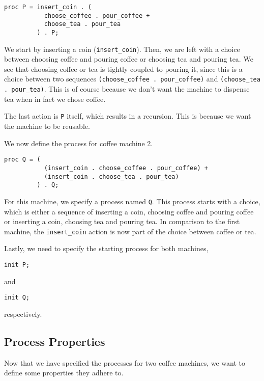 \documentclass{clseminar}
\begin{document}
  \begin{lstlisting}[language=mCRL2]
proc P = insert_coin . (
           choose_coffee . pour_coffee +
           choose_tea . pour_tea
         ) . P;
  \end{lstlisting}

  We start by inserting a coin (\texttt{insert\_coin}). Then, we are left with a choice between choosing coffee and pouring coffee or choosing tea and pouring tea. We see that choosing coffee or tea is tightly coupled to pouring it, since this is a choice between two sequences \texttt{(choose\_coffee . pour\_coffee)} and \texttt{(choose\_tea . pour\_tea)}. This is of course because we don't want the machine to dispense tea when in fact we chose coffee.

  The last action is \texttt{P} itself, which results in a recursion. This is because we want the machine to be reusable.

  We now define the process for coffee machine 2.

  \begin{lstlisting}[language=mCRL2]
proc Q = (
           (insert_coin . choose_coffee . pour_coffee) +
           (insert_coin . choose_tea . pour_tea)
         ) . Q;
  \end{lstlisting}

  For this machine, we specify a process named \texttt{Q}. This process starts with a choice, which is either a sequence of inserting a coin, choosing coffee and pouring coffee or inserting a coin, choosing tea and pouring tea. In comparison to the first machine, the \texttt{insert\_coin} action is now part of the choice between coffee or tea.

  Lastly, we need to specify the starting process for both machines,

  \begin{lstlisting}[language=mCRL2]
init P;
  \end{lstlisting}

  and

  \begin{lstlisting}[language=mCRL2]
init Q;
  \end{lstlisting}

  respectively.

  \subsection{Process Properties}

  Now that we have specified the processes for two coffee machines, we want to define some properties they adhere to.
\end{document}
